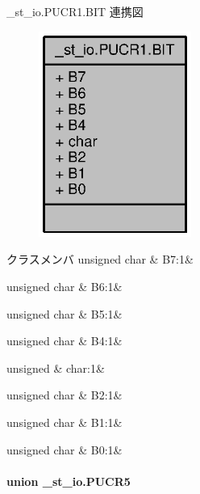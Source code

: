 \+\_\+st\+\_\+io.\+P\+U\+C\+R1.\+B\+I\+T 連携図
\nopagebreak
\begin{figure}[H]
\begin{center}
\leavevmode
\includegraphics[width=142pt]{d7/de7/struct__st__io_8PUCR1_8BIT__coll__graph}
\end{center}
\end{figure}
\begin{DoxyFields}{クラスメンバ}
unsigned char\label{3694s_8h_ad8498108dd603522047564a8da7be94c}
&
B7\+:1&
\\
\hline

unsigned char\label{3694s_8h_a68b1f1cc15d8987eafe633c9488bdc05}
&
B6\+:1&
\\
\hline

unsigned char\label{3694s_8h_a2a1ab298edf0162a3305e599b47cbeee}
&
B5\+:1&
\\
\hline

unsigned char\label{3694s_8h_ad5d4cc7b09d1843517acc9361f8f665e}
&
B4\+:1&
\\
\hline

unsigned\label{3694s_8h_aa87deb01c5f539e6bda34829c8ef2368}
&
char\+:1&
\\
\hline

unsigned char\label{3694s_8h_abbd97b00c539801e32317ab550867ec4}
&
B2\+:1&
\\
\hline

unsigned char\label{3694s_8h_ac9512565ef6194ca664dc41ec0de7a53}
&
B1\+:1&
\\
\hline

unsigned char\label{3694s_8h_a4c769c2c9989abb9fa024ab9930270e5}
&
B0\+:1&
\\
\hline

\end{DoxyFields}
\label{union__st__io_8PUCR5}
\paragraph{union \+\_\+st\+\_\+io.\+P\+U\+C\+R5}


